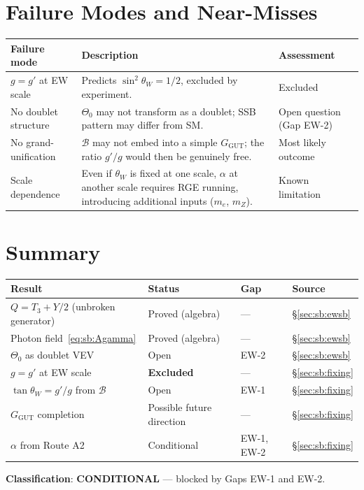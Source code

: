 \documentclass[12pt,a4paper]{article}
\theoremstyle{definition}
\theoremstyle{remark}
\begin{document}
\section{Failure Modes and Near-Misses}
\label{sec:sb:failures}

\begin{longtable}{p{3.5cm} p{7cm} p{3cm}}
\toprule
\textbf{Failure mode} & \textbf{Description} & \textbf{Assessment} \\
\midrule
$g = g'$ at EW scale &
  Predicts $\sin^2\theta_W = 1/2$, excluded by experiment. &
  Excluded \\
\midrule
No doublet structure &
  $\Theta_0$ may not transform as a doublet; SSB pattern may differ from SM. &
  Open question (Gap EW-2) \\
\midrule
No grand-unification &
  $\mathcal{B}$ may not embed into a simple $G_{\mathrm{GUT}}$; the ratio $g'/g$
  would then be genuinely free. &
  Most likely outcome \\
\midrule
Scale dependence &
  Even if $\theta_W$ is fixed at one scale, $\alpha$ at another scale requires
  RGE running, introducing additional inputs ($m_e$, $m_Z$). &
  Known limitation \\
\bottomrule
\end{longtable}

\section{Summary}
\label{sec:sb:summary}

\begin{center}
\begin{tabular}{llll}
\toprule
Result & Status & Gap & Source \\
\midrule
$Q = T_3 + Y/2$ (unbroken generator) & Proved (algebra) & — & \S\ref{sec:sb:ewsb} \\
Photon field~\eqref{eq:sb:Agamma} & Proved (algebra) & — & \S\ref{sec:sb:ewsb} \\
$\Theta_0$ as doublet VEV & Open & EW-2 & \S\ref{sec:sb:ewsb} \\
$g = g'$ at EW scale & \textbf{Excluded} & — & \S\ref{sec:sb:fixing} \\
$\tan\theta_W = g'/g$ from $\mathcal{B}$ & Open & EW-1 & \S\ref{sec:sb:fixing} \\
$G_{\mathrm{GUT}}$ completion & Possible future direction & — & \S\ref{sec:sb:fixing} \\
$\alpha$ from Route A2 & Conditional & EW-1, EW-2 & \S\ref{sec:sb:fixing} \\
\bottomrule
\end{tabular}
\end{center}

\noindent\textbf{Classification}: \textbf{CONDITIONAL} — blocked by Gaps EW-1 and EW-2.

\ifdefined\INCLUDEMODE
\else
  
\end{document}
